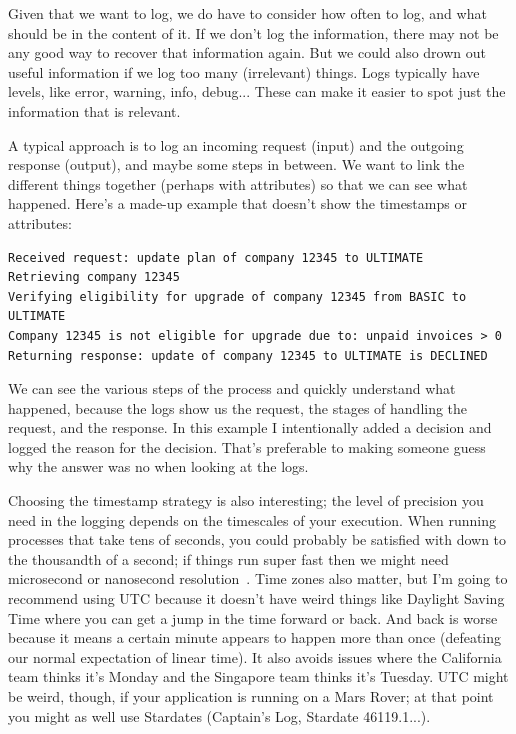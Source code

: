 Given that we want to log, we do have to consider how often to log, and what should be in the content of it. If we don't log the information, there may not be any good way to recover that information again. But we could also drown out useful information if we log too many (irrelevant) things. Logs typically have levels, like error, warning, info, debug... These can make it easier to spot just the information that is relevant.

A typical approach is to log an incoming request (input) and the outgoing response (output), and maybe some steps in between. We want to link the different things together (perhaps with attributes) so that we can see what happened. Here's a made-up example that doesn't show the timestamps or attributes:

\begin{verbatim}
Received request: update plan of company 12345 to ULTIMATE
Retrieving company 12345
Verifying eligibility for upgrade of company 12345 from BASIC to ULTIMATE
Company 12345 is not eligible for upgrade due to: unpaid invoices > 0
Returning response: update of company 12345 to ULTIMATE is DECLINED
\end{verbatim}

We can see the various steps of the process and quickly understand what happened, because the logs show us the request, the stages of handling the request, and the response. In this example I intentionally added a decision and logged the reason for the decision. That's preferable to making someone guess why the answer was no when looking at the logs.

Choosing the timestamp strategy is also interesting; the level of precision you need in the logging depends on the timescales of your execution. When running processes that take tens of seconds, you could probably be satisfied with down to the thousandth of a second; if things run super fast then we might need microsecond or nanosecond resolution~\cite{usd}. Time zones also matter, but I'm going to recommend using UTC because it doesn't have weird things like Daylight Saving Time where you can get a jump in the time forward or back. And back is worse because it means a certain minute appears to happen more than once (defeating our normal expectation of linear time). It also avoids issues where the California team thinks it's Monday and the Singapore team thinks it's Tuesday. UTC might be weird, though, if your application is running on a Mars Rover; at that point you might as well use Stardates (Captain's Log, Stardate 46119.1...).

